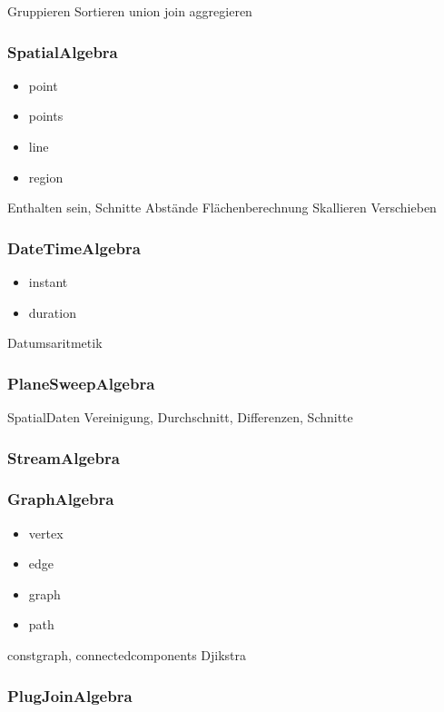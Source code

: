Gruppieren Sortieren union join aggregieren


\subsubsection{SpatialAlgebra}
\begin{itemize}
\item point
\item points
\item line
\item region
\end{itemize}

Enthalten sein, Schnitte Abstände
Flächenberechnung Skallieren Verschieben

\subsubsection{DateTimeAlgebra}
\begin{itemize}
\item instant
\item duration
\end{itemize}
Datumsaritmetik

\subsubsection{PlaneSweepAlgebra}
SpatialDaten
Vereinigung, Durchschnitt, Differenzen, Schnitte

\subsubsection{StreamAlgebra}

\subsubsection{GraphAlgebra}
\begin{itemize}
\item vertex
\item edge
\item graph
\item path

\end{itemize}

constgraph, connectedcomponents Djikstra

\subsubsection{PlugJoinAlgebra}

